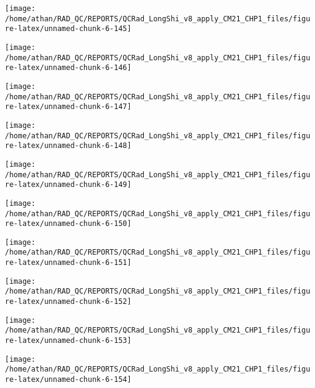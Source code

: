 \documentclass[
  10pt,
  a4paper,oneside]{article}
\begin{document}
\begin{center}\texttt{[image: /home/athan/RAD\_QC/REPORTS/QCRad\_LongShi\_v8\_apply\_CM21\_CHP1\_files/figure-latex/unnamed-chunk-6-145]} \end{center}

\begin{center}\texttt{[image: /home/athan/RAD\_QC/REPORTS/QCRad\_LongShi\_v8\_apply\_CM21\_CHP1\_files/figure-latex/unnamed-chunk-6-146]} \end{center}

\begin{center}\texttt{[image: /home/athan/RAD\_QC/REPORTS/QCRad\_LongShi\_v8\_apply\_CM21\_CHP1\_files/figure-latex/unnamed-chunk-6-147]} \end{center}

\begin{center}\texttt{[image: /home/athan/RAD\_QC/REPORTS/QCRad\_LongShi\_v8\_apply\_CM21\_CHP1\_files/figure-latex/unnamed-chunk-6-148]} \end{center}

\begin{center}\texttt{[image: /home/athan/RAD\_QC/REPORTS/QCRad\_LongShi\_v8\_apply\_CM21\_CHP1\_files/figure-latex/unnamed-chunk-6-149]} \end{center}

\begin{center}\texttt{[image: /home/athan/RAD\_QC/REPORTS/QCRad\_LongShi\_v8\_apply\_CM21\_CHP1\_files/figure-latex/unnamed-chunk-6-150]} \end{center}

\begin{center}\texttt{[image: /home/athan/RAD\_QC/REPORTS/QCRad\_LongShi\_v8\_apply\_CM21\_CHP1\_files/figure-latex/unnamed-chunk-6-151]} \end{center}

\begin{center}\texttt{[image: /home/athan/RAD\_QC/REPORTS/QCRad\_LongShi\_v8\_apply\_CM21\_CHP1\_files/figure-latex/unnamed-chunk-6-152]} \end{center}

\begin{center}\texttt{[image: /home/athan/RAD\_QC/REPORTS/QCRad\_LongShi\_v8\_apply\_CM21\_CHP1\_files/figure-latex/unnamed-chunk-6-153]} \end{center}

\begin{center}\texttt{[image: /home/athan/RAD\_QC/REPORTS/QCRad\_LongShi\_v8\_apply\_CM21\_CHP1\_files/figure-latex/unnamed-chunk-6-154]} \end{center}
\end{document}
